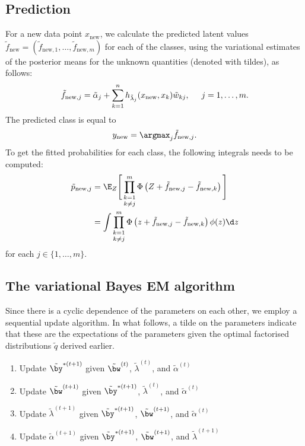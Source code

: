 \documentclass[]{article}
\begin{document}
\subsection{Prediction}

For a new data point $x_{\text{new}}$, we calculate the predicted latent values $\tilde f_{\text{new}} = (\tilde f_{\text{new},1}, \dots, \tilde f_{\text{new},m})$ for each of the classes, using the variational estimates of the posterior means for the unknown quantities (denoted with tildes), as follows:
\[
  \tilde f_{\text{new},j} = \tilde\alpha_j + \sum_{k=1}^n h_{\tilde\lambda_j}(x_{\text{new}}, x_{k})\tilde w_{kj}, \hspace{0.5cm} j = 1,\dots,m.
\]
The predicted class is equal to 
\[
  y_{\text{new}} = \argmax_j \tilde f_{\text{new},j}.
\]
To get the fitted probabilities for each class, the following integrals needs to be computed:
\begin{align*}
  \tilde p_{\text{new},j} 
  &= \E_Z \Bigg[ \mathop{\prod_{k=1}^m}_{k\neq j} \Phi\left(Z + \tilde f_{\text{new},j} - \tilde f_{\text{new},k} \right) \Bigg]  \\
  &= \int \mathop{\prod_{k=1}^m}_{k\neq j} \Phi\left(z + \tilde f_{\text{new},j} - \tilde f_{\text{new},k} \right) \phi(z) \d z
\end{align*}
for each $j \in \{1,\dots, m\}$.

\subsection{The variational Bayes EM algorithm}

Since there is a cyclic dependence of the parameters on each other, we employ a sequential update algorithm. In what follows, a tilde on the parameters indicate that these are the expectations of the parameters given the optimal factorised distributions $\tilde q$ derived earlier.
\begin{enumerate}[label={STEP \arabic*:}, leftmargin=2cm]
  \item Update $\tilde\by^{*(t+1)}$ given $\tilde\bw^{(t)}$, $\tilde\lambda^{(t)}$, and $\tilde\alpha^{(t)}$
  \item Update $\tilde\bw^{(t+1)}$ given $\tilde\by^{*(t+1)}$, $\tilde\lambda^{(t)}$, and $\tilde\alpha^{(t)}$
  \item Update $\tilde\lambda^{(t+1)}$ given $\tilde\by^{*(t+1)}$, $\tilde\bw^{(t+1)}$, and $\tilde\alpha^{(t)}$
  \item Update $\tilde\alpha^{(t+1)}$ given $\tilde\by^{*(t+1)}$, $\tilde\bw^{(t+1)}$, and $\tilde\lambda^{(t+1)}$
\end{enumerate}
\end{document}

